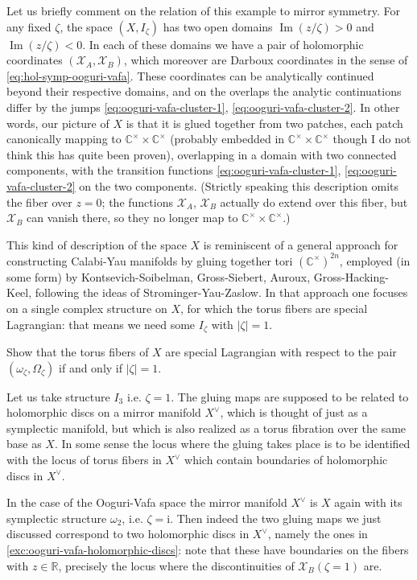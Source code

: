 \documentclass[12pt,letterpaper,reqno]{article}
\numberwithin{equation}{section}
\newcommand{\cX}{\ensuremath{\mathcal X}}
\newcommand{\R}{\ensuremath{\mathbb R}}
\newcommand{\C}{\ensuremath{\mathbb C}}
\newcommand{\I}{{\mathrm i}}
\newcommand{\abs}[1]{\lvert#1\rvert}
\DeclareMathOperator{\im}{Im}
\begin{document}
Let us briefly comment on the relation of this example to mirror symmetry.
For any fixed $\zeta$, the space $(X,I_\zeta)$
has two open domains $\im(z / \zeta) > 0$ and $\im(z / \zeta) < 0$. 
In each of these domains
we have a pair of holomorphic coordinates $(\cX_A, \cX_B)$, which moreover
are Darboux coordinates in the sense of \eqref{eq:hol-symp-ooguri-vafa}.
These coordinates can be analytically continued beyond their respective
domains, and on the overlaps the analytic continuations differ by the
jumps \eqref{eq:ooguri-vafa-cluster-1}, \eqref{eq:ooguri-vafa-cluster-2}.
In other words, our picture of $X$ is that it is glued together from 
two patches, each patch 
canonically mapping to $\C^\times \times \C^\times$ 
(probably embedded in $\C^\times \times \C^\times$ though I do not
think this has quite been proven),
overlapping in a domain with two connected components,
with the transition functions 
\eqref{eq:ooguri-vafa-cluster-1}, \eqref{eq:ooguri-vafa-cluster-2}
on the two components.
(Strictly speaking this description omits the fiber over $z = 0$;
the functions $\cX_A$, $\cX_B$ actually do extend over 
this fiber, but $\cX_B$ can vanish there, so they no longer map
to $\C^\times \times \C^\times$.)

This kind of description of the space $X$ is reminiscent of a general
approach for constructing Calabi-Yau manifolds by gluing
together tori $(\C^\times)^{2n}$, employed (in some form) by
Kontsevich-Soibelman, Gross-Siebert, Auroux, Gross-Hacking-Keel, following
the ideas of Strominger-Yau-Zaslow.
In that approach one focuses on a single complex structure on $X$, 
for which  the torus fibers are special Lagrangian: that means 
we need some $I_\zeta$ with $\abs{\zeta} = 1$. 

\begin{exercise} Show that the torus fibers of $X$ are special 
Lagrangian with respect to the pair $(\omega_\zeta, \Omega_\zeta)$ 
if and only if $\abs{\zeta} = 1$.
\end{exercise}

Let us take structure $I_3$ i.e.
$\zeta = 1$. The gluing maps are supposed to be related to
holomorphic discs on a mirror manifold $X^\vee$, which is thought of
just as a symplectic manifold, but which is also 
realized as a torus fibration over the same base as $X$. In some sense 
the locus where the gluing takes place is to be identified with the 
locus of torus fibers in $X^\vee$ 
which contain boundaries of holomorphic 
discs in $X^\vee$. 

In the case of the Ooguri-Vafa space
the mirror manifold $X^\vee$ is $X$ again with 
its symplectic structure $\omega_2$, i.e. $\zeta = \I$.
Then indeed the two gluing maps we just discussed correspond to two
holomorphic discs in $X^\vee$, namely the ones
in \autoref{exc:ooguri-vafa-holomorphic-discs}:
note that these have boundaries on the fibers with $z \in \R$,
precisely the locus where the discontinuities of $\cX_B(\zeta = 1)$ are.
\end{document}
